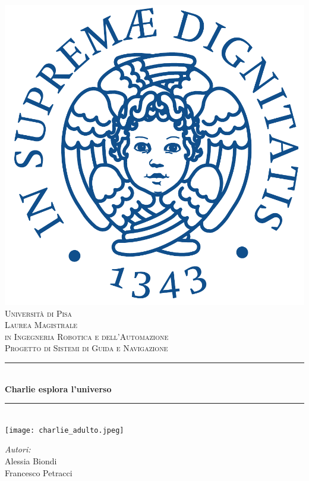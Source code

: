 \begin{titlepage}
	\centering
	\vspace*{0.0 cm}
	\includegraphics[height=.2\textheight]{figs/cherubino_pant541.pdf}\\[0.5 cm]			%
	\textsc{\Large Universit\`a di Pisa }\\[0.5 cm]							%
	\textsc{\large Laurea Magistrale \\ 
		\vspace{2mm} in Ingegneria Robotica e dell'Automazione}\\[0.5 cm]
	\textsc{Progetto di Sistemi di Guida e Navigazione}\\[0.25 cm]	
	
	\rule{\linewidth}{0.2 mm} \\[0.4 cm]
	{ \Large{\textbf{Charlie esplora l'universo}}}\\
	\rule{\linewidth}{0.2 mm} \\[0.5 cm]
	
    
	\texttt{[image: charlie\_adulto.jpeg]}
	
	\vspace{2 cm}
	\begin{minipage}{0.48\textwidth}
		\begin{flushleft}
			\textit{Autori:}\\
			Alessia Biondi\\
			Francesco Petracci
			

\end{flushleft}
\end{minipage}
\end{titlepage}
